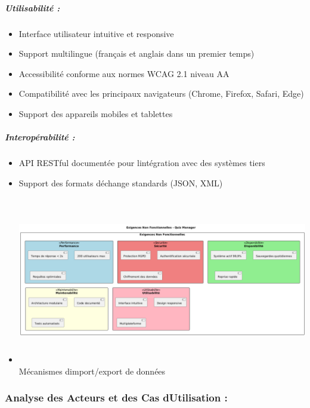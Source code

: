 \documentclass[12pt,a4paper,twoside]{report}
\begin{document}
\hypertarget{utilisabilituxe9}{%
\subparagraph{Utilisabilité :}\label{utilisabilituxe9}}

\begin{itemize}
\item
  Interface utilisateur intuitive et responsive
\item
  Support multilingue (français et anglais dans un premier temps)
\item
  Accessibilité conforme aux normes WCAG 2.1 niveau AA
\item
  Compatibilité avec les principaux navigateurs (Chrome, Firefox,
  Safari, Edge)
\item
  Support des appareils mobiles et tablettes
\end{itemize}

\hypertarget{interopuxe9rabilituxe9}{%
\subparagraph{Interopérabilité :}\label{interopuxe9rabilituxe9}}

\begin{itemize}
\item
  API RESTful documentée pour l\textquotesingle intégration avec des
  systèmes tiers
\item
  Support des formats d\textquotesingle échange standards (JSON, XML)
\item
  \includegraphics[width=6.72639in,height=2.88611in]{latex_media/media/image12.png}Mécanismes
  d\textquotesingle import/export de données
\end{itemize}

\hypertarget{analyse-des-acteurs-et-des-cas-dutilisation}{%
\subsubsection{Analyse des Acteurs et des Cas
d\textquotesingle Utilisation
:}\label{analyse-des-acteurs-et-des-cas-dutilisation}}
\end{document}
